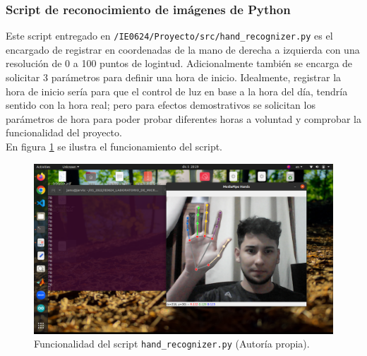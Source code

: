 \subsubsection{Script de reconocimiento de imágenes de Python}
Este script entregado en \texttt{/IE0624/Proyecto/src/hand\_recognizer.py} es el encargado de registrar en coordenadas  de la mano de derecha a izquierda con una resolución de 0 a 100 puntos de logintud. Adicionalmente también se encarga de solicitar 3 parámetros para definir una hora de inicio. Idealmente, registrar la hora de inicio sería para que el control de luz en base a la hora del día, tendría sentido con la hora real; pero para efectos demostrativos se solicitan los parámetros de hora para poder probar diferentes horas a voluntad y comprobar la funcionalidad del proyecto.\\
En figura \ref{mano} se ilustra el funcionamiento del script.
\begin{figure}[H]
\centering
\includegraphics[scale=0.40]{./images/mano.png} 
\caption{Funcionalidad del script \texttt{hand\_recognizer.py} (Autoría propia).}
\label{mano}
\end{figure}

